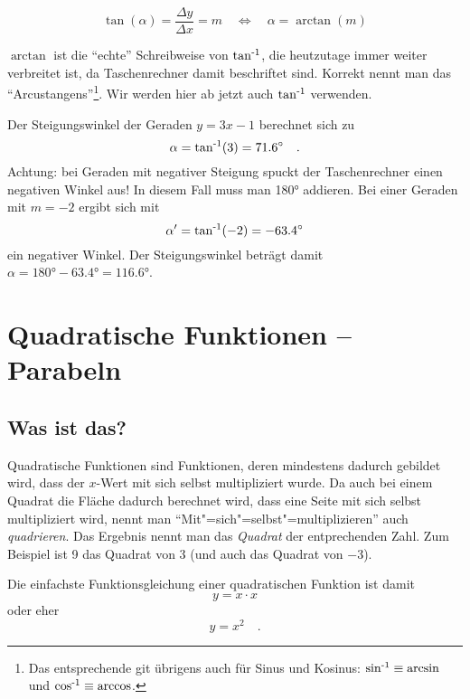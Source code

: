 \documentclass[loadfonts,babel=ngerman]{arbeitsblatt}
\begin{document}
\begin{equation}
  \label{eq:steigungswinkel}
  \tan(\alpha) = \frac{\Delta y}{\Delta x} = m
  \quad \Leftrightarrow \quad
  \alpha = \arctan(m)
\end{equation}

$\arctan$ ist die "`echte"' Schreibweise von $\operatorname{tan^{-1}}$, die heutzutage immer
weiter verbreitet ist, da Taschenrechner damit beschriftet sind.  Korrekt
nennt man das "`Arcustangens"'\footnote{Das entsprechende git übrigens auch
  für Sinus und Kosinus: $\operatorname{sin^{-1}}\equiv\arcsin$ und $\operatorname{cos^{-1}}\equiv\arccos$.}.  Wir
werden hier ab jetzt auch $\operatorname{tan^{-1}}$ verwenden.

\begin{beispiel}\label{bsp:steigungswinkel}
  Der Steigungswinkel der Geraden $y=3x-1$ berechnet sich zu
  \begin{equation*}
    \alpha = \operatorname{tan^{-1}}(3) = \ang{71.6} \quad.
  \end{equation*}
  Achtung: bei Geraden mit negativer Steigung spuckt der Taschenrechner einen
  negativen Winkel aus!  In diesem Fall muss man \ang{180} addieren.  Bei
  einer Geraden mit $m=-2$ ergibt sich mit
  \begin{equation*}
    \alpha' = \operatorname{tan^{-1}}(-2) = \ang{-63.4}
  \end{equation*}
  ein negativer Winkel.  Der Steigungswinkel beträgt damit $\alpha=\ang{180} -
  \ang{63.4} = \ang{116.6}$.
\end{beispiel}

\section{Quadratische Funktionen -- Parabeln}\label{sec:quadr-funkt-parab}
\subsection{Was ist das?}
Quadratische Funktionen sind Funktionen, deren 
mindestens dadurch gebildet wird, dass der $x$-Wert mit sich selbst
multipliziert wurde.  Da auch bei einem Quadrat die Fläche dadurch berechnet
wird, dass eine Seite mit sich selbst multipliziert wird, nennt man
"`Mit"=sich"=selbst"=multiplizieren"' auch \emph{quadrieren}.  Das Ergebnis
nennt man das \emph{Quadrat} der entprechenden Zahl.  Zum Beispiel ist \num{9}
das Quadrat von \num{3} (und auch das Quadrat von \num{-3}).

Die einfachste Funktionsgleichung einer quadratischen Funktion ist damit
\begin{equation}
  \label{eq:quadr-funkt-simpel}
  y = x\cdot x
\end{equation}
oder eher
\begin{equation}
  \label{eq:quadr-funkt-basis}
  y = x^2 \quad.
\end{equation}
\end{document}
